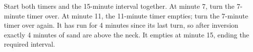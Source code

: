 Start both timers and the 15-minute interval together. At minute 7, turn the 7-minute timer over. At minute 11, the 11-minute timer empties; turn the 7-minute timer over again. It has run for 4 minutes since its last turn, so after inversion exactly 4 minutes of sand are above the neck. It empties at minute 15, ending the required interval.
